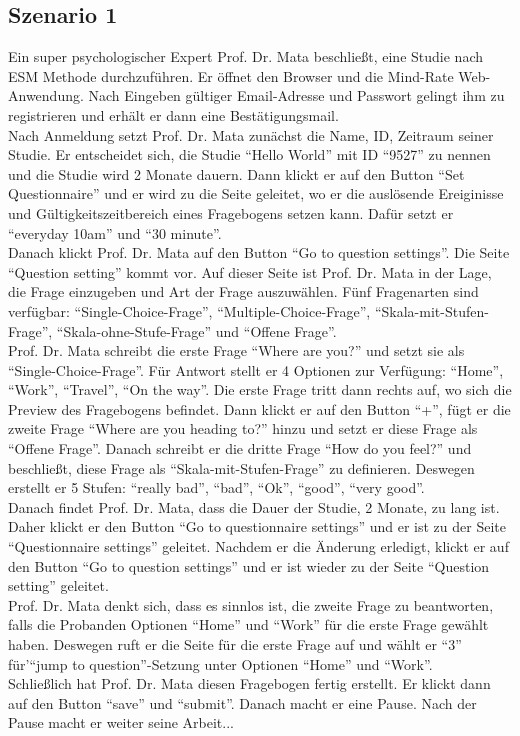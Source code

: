 \documentclass[a4paper]{scrreprt}
\begin{document}
            \subsection{Szenario 1}
                Ein super psychologischer Expert Prof. Dr. Mata beschließt, eine Studie nach ESM Methode durchzuf\"uhren. Er \"offnet den Browser und die Mind-Rate Web-Anwendung. Nach Eingeben g\"ultiger Email-Adresse und Passwort gelingt ihm zu registrieren und erh\"alt er dann eine Bestätigungsmail. \\
                Nach Anmeldung setzt Prof. Dr. Mata zun\"achst die Name, ID, Zeitraum seiner Studie. Er entscheidet sich, die Studie ``Hello World'' mit ID ``9527'' zu nennen und die Studie wird 2 Monate dauern. Dann klickt er auf den Button ``Set Questionnaire'' und er wird zu die Seite geleitet, wo er die auslösende Ereiginisse und G\"ultigkeitszeitbereich eines Fragebogens setzen kann. Daf\"ur setzt er ``everyday 10am'' und ``30 minute''. \\
                Danach klickt Prof. Dr. Mata auf den Button ``Go to question settings''. Die Seite ``Question setting'' kommt vor. Auf dieser Seite ist Prof. Dr. Mata in der Lage, die Frage einzugeben und Art der Frage auszuw\"ahlen. F\"unf Fragenarten sind verf\"ugbar: ``Single-Choice-Frage'', ``Multiple-Choice-Frage'', ``Skala-mit-Stufen-Frage'', ``Skala-ohne-Stufe-Frage'' und ``Offene Frage''. \\
                Prof. Dr. Mata schreibt die erste Frage ``Where are you?'' und setzt sie als ``Single-Choice-Frage''. Für Antwort stellt er 4 Optionen zur Verf\"ugung: ``Home'', ``Work'', ``Travel'', ``On the way''. Die erste Frage tritt dann rechts auf, wo sich die Preview des Fragebogens befindet. Dann klickt er auf den Button ``+'', f\"ugt er die zweite Frage ``Where are you heading to?'' hinzu und setzt er diese Frage als ``Offene Frage''. Danach schreibt er die dritte Frage ``How do you feel?'' und beschließt, diese Frage als ``Skala-mit-Stufen-Frage'' zu definieren. Deswegen erstellt er 5 Stufen: ``really bad'', ``bad'', ``Ok'', ``good'', ``very good''. \\
                Danach findet Prof. Dr. Mata, dass die Dauer der Studie, 2 Monate,  zu lang ist. Daher klickt er den Button ``Go to questionnaire settings'' und er ist zu der Seite ``Questionnaire settings'' geleitet. Nachdem er die \"Anderung erledigt, klickt er auf den Button ``Go to question settings'' und er ist wieder zu der Seite ``Question setting'' geleitet. \\
                Prof. Dr. Mata denkt sich, dass es sinnlos ist, die zweite Frage zu beantworten, falls die Probanden Optionen ``Home'' und ``Work'' f\"ur die erste Frage gew\"ahlt haben. Deswegen ruft er die Seite f\"ur die erste Frage auf und w\"ahlt er ``3'' f\"ur'``jump to question''-Setzung unter Optionen ``Home'' und ``Work''. \\
                Schließlich hat Prof. Dr. Mata diesen Fragebogen fertig erstellt. Er klickt dann auf den Button ``save'' und ``submit''. Danach macht er eine Pause. Nach der Pause macht er weiter seine Arbeit...\\
\end{document}
